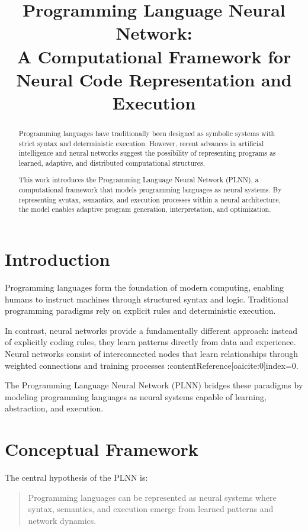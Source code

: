 \documentclass[12pt]{article}
\title{\textbf{Programming Language Neural Network: \\ A Computational Framework for Neural Code Representation and Execution}}
\author{}
\date{}
\begin{document}
\maketitle

\begin{abstract}
Programming languages have traditionally been designed as symbolic systems with strict syntax and deterministic execution. However, recent advances in artificial intelligence and neural networks suggest the possibility of representing programs as learned, adaptive, and distributed computational structures.

This work introduces the Programming Language Neural Network (PLNN), a computational framework that models programming languages as neural systems. By representing syntax, semantics, and execution processes within a neural architecture, the model enables adaptive program generation, interpretation, and optimization.
\end{abstract}

\section{Introduction}

Programming languages form the foundation of modern computing, enabling humans to instruct machines through structured syntax and logic. Traditional programming paradigms rely on explicit rules and deterministic execution.

In contrast, neural networks provide a fundamentally different approach: instead of explicitly coding rules, they learn patterns directly from data and experience. Neural networks consist of interconnected nodes that learn relationships through weighted connections and training processes :contentReference[oaicite:0]{index=0}.

The Programming Language Neural Network (PLNN) bridges these paradigms by modeling programming languages as neural systems capable of learning, abstraction, and execution.

\section{Conceptual Framework}

The central hypothesis of the PLNN is:

\begin{quote}
Programming languages can be represented as neural systems where syntax, semantics, and execution emerge from learned patterns and network dynamics.
\end{quote}
\end{document}

